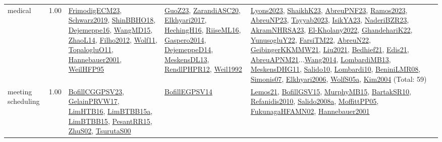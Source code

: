 {\begin{longtable}{p{3cm}r>{\raggedright\arraybackslash}p{6cm}>{\raggedright\arraybackslash}p{6cm}>{\raggedright\arraybackslash}p{8cm}}
\index{medical}\index{ApplicationAreas!medical}medical &  1.00 & \hyperref[detail:FrimodigECM23]{FrimodigECM23}, \hyperref[detail:Schwarz2019]{Schwarz2019}, \hyperref[detail:ShinBBHO18]{ShinBBHO18}, \hyperref[detail:Dejemeppe16]{Dejemeppe16}, \hyperref[detail:WangMD15]{WangMD15}, \hyperref[detail:ZhaoL14]{ZhaoL14}, \hyperref[detail:Filho2012]{Filho2012}, \hyperref[detail:Wolf11]{Wolf11}, \hyperref[detail:TopalogluO11]{TopalogluO11}, \hyperref[detail:Hannebauer2001]{Hannebauer2001}, \hyperref[detail:WeilHFP95]{WeilHFP95} & \hyperref[detail:GuoZ23]{GuoZ23}, \hyperref[detail:ZarandiASC20]{ZarandiASC20}, \hyperref[detail:Elkhyari2017]{Elkhyari2017}, \hyperref[detail:HechingH16]{HechingH16}, \hyperref[detail:RiiseML16]{RiiseML16}, \hyperref[detail:Gaspero2014]{Gaspero2014}, \hyperref[detail:DejemeppeD14]{DejemeppeD14}, \hyperref[detail:MeskensDL13]{MeskensDL13}, \hyperref[detail:RendlPHPR12]{RendlPHPR12}, \hyperref[detail:Weil1992]{Weil1992} & \hyperref[detail:Lyons2023]{Lyons2023}, \hyperref[detail:ShaikhK23]{ShaikhK23}, \hyperref[detail:AbreuPNF23]{AbreuPNF23}, \hyperref[detail:Ramos2023]{Ramos2023}, \hyperref[detail:AbreuNP23]{AbreuNP23}, \hyperref[detail:Tayyab2023]{Tayyab2023}, \hyperref[detail:IsikYA23]{IsikYA23}, \hyperref[detail:NaderiBZR23]{NaderiBZR23}, \hyperref[detail:AkramNHRSA23]{AkramNHRSA23}, \hyperref[detail:El-Kholany2022]{El-Kholany2022}, \hyperref[detail:GhandehariK22]{GhandehariK22}, \hyperref[detail:YunusogluY22]{YunusogluY22}, \hyperref[detail:FarsiTM22]{FarsiTM22}, \hyperref[detail:AbreuN22]{AbreuN22}, \hyperref[detail:GeibingerKKMMW21]{GeibingerKKMMW21}, \hyperref[detail:Liu2021]{Liu2021}, \hyperref[detail:Bedhief21]{Bedhief21}, \hyperref[detail:Edis21]{Edis21}, \hyperref[detail:AbreuAPNM21]{AbreuAPNM21}...\hyperref[detail:Wang2014]{Wang2014}, \hyperref[detail:LombardiMB13]{LombardiMB13}, \hyperref[detail:MeskensDHG11]{MeskensDHG11}, \hyperref[detail:Salido10]{Salido10}, \hyperref[detail:Lombardi10]{Lombardi10}, \hyperref[detail:BeniniLMR08]{BeniniLMR08}, \hyperref[detail:Simonis07]{Simonis07}, \hyperref[detail:Elkhyari2006]{Elkhyari2006}, \hyperref[detail:WolfS05a]{WolfS05a}, \hyperref[detail:Kim2004]{Kim2004} (Total: 59)\\
\index{meeting scheduling}\index{ApplicationAreas!meeting scheduling}meeting scheduling &  1.00 & \hyperref[detail:BofillCGGPSV23]{BofillCGGPSV23}, \hyperref[detail:GelainPRVW17]{GelainPRVW17}, \hyperref[detail:LimHTB16]{LimHTB16}, \hyperref[detail:LimBTBB15a]{LimBTBB15a}, \hyperref[detail:LimBTBB15]{LimBTBB15}, \hyperref[detail:PesantRR15]{PesantRR15}, \hyperref[detail:ZhuS02]{ZhuS02}, \hyperref[detail:TsurutaS00]{TsurutaS00} & \hyperref[detail:BofillEGPSV14]{BofillEGPSV14} & \hyperref[detail:Lemos21]{Lemos21}, \hyperref[detail:BofillGSV15]{BofillGSV15}, \hyperref[detail:MurphyMB15]{MurphyMB15}, \hyperref[detail:BartakSR10]{BartakSR10}, \hyperref[detail:Refanidis2010]{Refanidis2010}, \hyperref[detail:Salido2008a]{Salido2008a}, \hyperref[detail:MoffittPP05]{MoffittPP05}, \hyperref[detail:FukunagaHFAMN02]{FukunagaHFAMN02}, \hyperref[detail:Hannebauer2001]{Hannebauer2001}\\

\end{longtable}}
